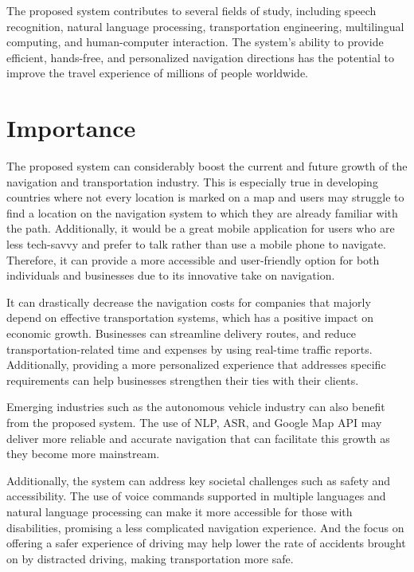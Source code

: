 \documentclass{epsrc}
\begin{document}
The proposed system contributes to several fields of study, including speech recognition, natural language processing, transportation engineering, multilingual computing, and human-computer interaction. The system's ability to provide efficient, hands-free, and personalized navigation directions has the potential to improve the travel experience of millions of people worldwide.

\part{Importance}
\vspace{5pt}

The proposed system can considerably boost the current and future growth of the navigation and transportation industry.  This is especially true in developing countries where not every location is marked on a map and users may struggle to find a location on the navigation system to which they are already familiar with the path. Additionally, it would be a great mobile application for users who are less tech-savvy and prefer to talk rather than use a mobile phone to navigate. Therefore, it can provide a more accessible and user-friendly option for both individuals and businesses due to its innovative take on navigation. 
\vspace{5pt}

It can drastically decrease the navigation costs for companies that majorly depend on effective transportation systems, which has a positive impact on economic growth. Businesses can streamline delivery routes, and reduce transportation-related time and expenses by using real-time traffic reports. Additionally, providing a more personalized experience that addresses specific requirements can help businesses strengthen their ties with their clients.
\vspace{5pt}

Emerging industries such as the autonomous vehicle industry can also benefit from the proposed system. The use of NLP, ASR, and Google Map API may deliver more reliable and accurate navigation that can facilitate this growth as they become more mainstream.
\vspace{5pt}

Additionally, the system can address key societal challenges such as safety and accessibility. The use of voice commands supported  in multiple languages and natural language processing can make it more accessible for those with disabilities, promising a less complicated navigation experience. And the focus on offering a safer experience of driving may help lower the rate of accidents brought on by distracted driving, making transportation more safe.
\vspace{5pt}
\end{document}
